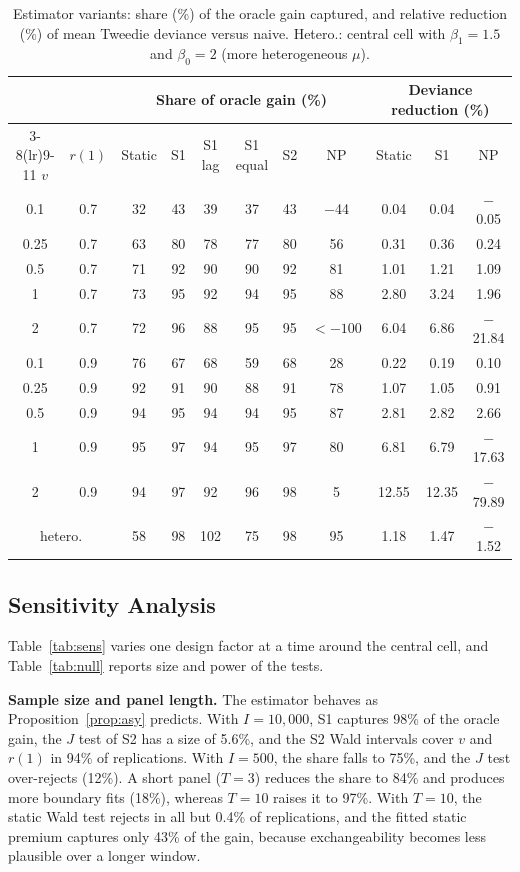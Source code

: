 \documentclass[mathematics,article,submit,moreauthors]{Definitions/mdpi}
\begin{document}
\begin{table}[H]
\caption{Estimator variants: share (\%) of the oracle gain captured, and relative reduction (\%) of mean Tweedie deviance versus naive. Hetero.: central cell with $\beta_1=1.5$ and $\beta_0=2$ (more heterogeneous $\mu$).\label{tab:variants}}
\small
\begin{tabular*}{\textwidth}{@{\extracolsep{\fill}}ccccccccccc@{}}
\toprule
 & & \multicolumn{6}{c}{Share of oracle gain (\%)} & \multicolumn{3}{c}{Deviance reduction (\%)} \\
\cmidrule(lr){3-8}\cmidrule(lr){9-11}
$v$ & $r(1)$ & Static & S1 & S1 lag & S1 equal & S2 & NP & Static & S1 & NP \\
\midrule
0.1 & 0.7 & 32 & 43 & 39 & 37 & 43 & $-$44 & 0.04 & 0.04 & $-$0.05 \\
0.25 & 0.7 & 63 & 80 & 78 & 77 & 80 & 56 & 0.31 & 0.36 & 0.24 \\
0.5 & 0.7 & 71 & 92 & 90 & 90 & 92 & 81 & 1.01 & 1.21 & 1.09 \\
1 & 0.7 & 73 & 95 & 92 & 94 & 95 & 88 & 2.80 & 3.24 & 1.96 \\
2 & 0.7 & 72 & 96 & 88 & 95 & 95 & $<-100$ & 6.04 & 6.86 & $-$21.84 \\
0.1 & 0.9 & 76 & 67 & 68 & 59 & 68 & 28 & 0.22 & 0.19 & 0.10 \\
0.25 & 0.9 & 92 & 91 & 90 & 88 & 91 & 78 & 1.07 & 1.05 & 0.91 \\
0.5 & 0.9 & 94 & 95 & 94 & 94 & 95 & 87 & 2.81 & 2.82 & 2.66 \\
1 & 0.9 & 95 & 97 & 94 & 95 & 97 & 80 & 6.81 & 6.79 & $-$17.63 \\
2 & 0.9 & 94 & 97 & 92 & 96 & 98 & 5 & 12.55 & 12.35 & $-$79.89 \\
\multicolumn{2}{c}{hetero.} & 58 & 98 & 102 & 75 & 98 & 95 & 1.18 & 1.47 & $-$1.52 \\
\bottomrule
\end{tabular*}
\end{table}

\subsection{Sensitivity Analysis}\label{sec:sensitivity}

Table~\ref{tab:sens} varies one design factor at a time around the central cell, and Table~\ref{tab:null} reports size and power of the tests.

\textbf{Sample size and panel length.} The estimator behaves as Proposition~\ref{prop:asy} predicts. With $I=10{,}000$, S1 captures 98\% of the oracle gain, the $J$ test of S2 has a size of 5.6\%, and the S2 Wald intervals cover $v$ and $r(1)$ in 94\% of replications. With $I=500$, the share falls to 75\%, and the $J$ test over-rejects (12\%). A short panel ($T=3$) reduces the share to 84\% and produces more boundary fits (18\%), whereas $T=10$ raises it to 97\%. With $T=10$, the static Wald test rejects in all but 0.4\% of replications, and the fitted static premium captures only 43\% of the gain, because exchangeability becomes less plausible over a longer window.
\end{document}
